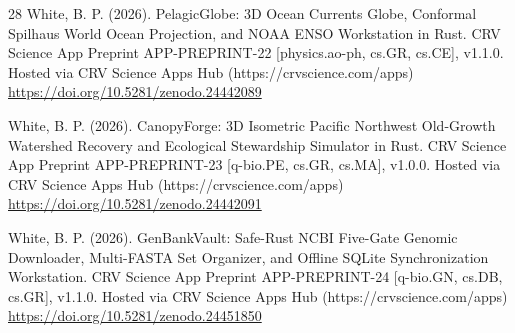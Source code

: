 \documentclass[10pt,letterpaper]{article}
\begin{document}
\begin{thebibliography}{28}
 White, B. P. (2026). PelagicGlobe: 3D Ocean Currents Globe, Conformal Spilhaus World Ocean Projection, and NOAA ENSO Workstation in Rust. CRV Science App Preprint APP-PREPRINT-22 [physics.ao-ph, cs.GR, cs.CE], v1.1.0. Hosted via CRV Science Apps Hub (https://crvscience.com/apps) \url{https://doi.org/10.5281/zenodo.24442089}

 White, B. P. (2026). CanopyForge: 3D Isometric Pacific Northwest Old-Growth Watershed Recovery and Ecological Stewardship Simulator in Rust. CRV Science App Preprint APP-PREPRINT-23 [q-bio.PE, cs.GR, cs.MA], v1.0.0. Hosted via CRV Science Apps Hub (https://crvscience.com/apps) \url{https://doi.org/10.5281/zenodo.24442091}

 White, B. P. (2026). GenBankVault: Safe-Rust NCBI Five-Gate Genomic Downloader, Multi-FASTA Set Organizer, and Offline SQLite Synchronization Workstation. CRV Science App Preprint APP-PREPRINT-24 [q-bio.GN, cs.DB, cs.GR], v1.1.0. Hosted via CRV Science Apps Hub (https://crvscience.com/apps) \url{https://doi.org/10.5281/zenodo.24451850}
\end{thebibliography}
\end{document}
